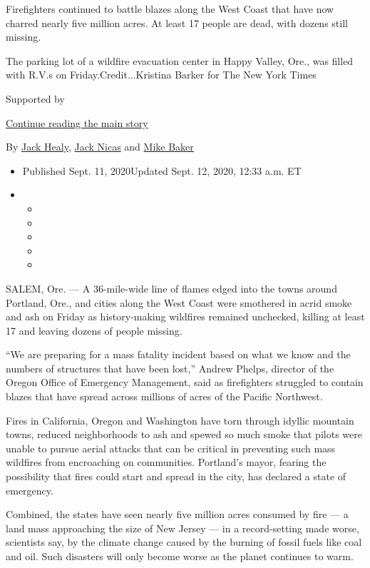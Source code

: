 Firefighters continued to battle blazes along the West Coast that have
now charred nearly five million acres. At least 17 people are dead, with
dozens still missing.

The parking lot of a wildfire evacuation center in Happy Valley, Ore.,
was filled with R.V.s on Friday.Credit...Kristina Barker for The New
York Times

Supported by

\protect\hyperlink{after-sponsor}{Continue reading the main story}

By \href{https://www.nytimes3xbfgragh.onion/by/jack-healy}{Jack Healy},
\href{https://www.nytimes3xbfgragh.onion/by/jack-nicas}{Jack Nicas} and
\href{https://www.nytimes3xbfgragh.onion/by/mike-baker}{Mike Baker}

\begin{itemize}
\item
  Published Sept. 11, 2020Updated Sept. 12, 2020, 12:33 a.m. ET
\item
  \begin{itemize}
  \item
  \item
  \item
  \item
  \item
  \end{itemize}
\end{itemize}

SALEM, Ore. --- A 36-mile-wide line of flames edged into the towns
around Portland, Ore., and cities along the West Coast were smothered in
acrid smoke and ash on Friday as history-making wildfires remained
unchecked, killing at least 17 and leaving dozens of people missing.

``We are preparing for a mass fatality incident based on what we know
and the numbers of structures that have been lost,'' Andrew Phelps,
director of the Oregon Office of Emergency Management, said as
firefighters struggled to contain blazes that have spread across
millions of acres of the Pacific Northwest.

Fires in California, Oregon and Washington have torn through idyllic
mountain towns, reduced neighborhoods to ash and spewed so much smoke
that pilots were unable to pursue aerial attacks that can be critical in
preventing such mass wildfires from encroaching on communities.
Portland's mayor, fearing the possibility that fires could start and
spread in the city, has declared a state of emergency.

Combined, the states have seen nearly five million acres consumed by
fire --- a land mass approaching the size of New Jersey --- in a
record-setting made worse, scientists say, by the climate change caused
by the burning of fossil fuels like coal and oil. Such disasters will
only become worse as the planet continues to warm.


